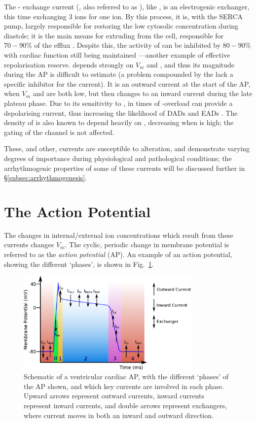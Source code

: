 \documentclass[../thesis-main.tex]{subfiles}
\begin{document}
The \na{}-\ca{} exchange current (\inaca{}, also referred to as \incx{}), like \inak{}, is an electrogenic exchanger, this time exchanging 3 \na{} ions for one \ca{} ion. By this process, it is, with the SERCA pump, largely responsible for restoring the low cytosolic \ca{} concentration during diastole; it is the main means for extruding \ca{} from the cell, responsible for $70-90\%$ of the \ca{} efflux \citep{Eisner2004}. Despite this, the activity of \inaca{} can be inhibited by $80-90\%$ with cardiac function still being maintained \citep{Henderson2004}---another example of effective repolarisation reserve. \inaca{} depends strongly on $V_m$ and \cai{} \citep{Clusin1983}, and thus its magnitude during the AP is difficult to estimate (a problem compounded by the lack a specific inhibitor for the current). It is an outward current at the start of the AP, when $V_m$ and \cai{} are both low, but then changes to an inward current during the late plateau phase. Due to its sensitivity to \cai{}, in times of \ca{}-overload \inaca{} can provide a depolarising current, thus increasing the likelihood of DADs and EADs \citep{Clusin2003}. The density of \ina{} is also known to depend heavily on \cai{}, decreasing when \cai{} is high; the gating of the channel is not affected.

These, and other, currents are susceptible to alteration, and demonstrate varying degrees of importance during physiological and pathological conditions; the arrhythmogenic properties of some of these currents will be discussed further in \S\ref{subsec:arrhythmogenesis}.

\section{The Action Potential}
\label{sec:action-potential}
The changes in internal/external ion concentrations which result from these currents changes $V_m$. The cyclic, periodic change in membrane potential is referred to as the \emph{action potential} (AP). An example of an action potential, showing the different `phases', is shown in Fig.~\ref{fig:ap-structure}. 
\begin{figure}
 \centering
 \includegraphics[width=0.8\textwidth]{ap-structure-full}
 \caption[Schematic of a cardiac AP]{Schematic of a ventricular cardiac AP, with the different `phases' of the AP shown, and which key currents are involved in each phase. Upward arrows represent outward currents, inward currents represent inward currents, and double arrows represent exchangers, \idest{} where current moves in both an inward and outward direction.}
 \label{fig:ap-structure}
\end{figure}
\end{document}
